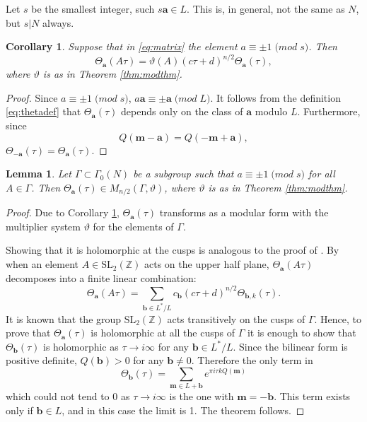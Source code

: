 \documentclass[11pt,a4paper]{amsart}
\newtheorem{lemma}[theorem]{Lemma}
\newtheorem{corollary}[theorem]{Corollary}
\theoremstyle{definition}
\newcommand{\SZ}{\mathbb{Z}}                    %
\begin{document}
Let $s$ be the smallest integer, such $s\mathbf{a} \in L$. This is, in general, not the same as $N$, but $s|N$ always. 
\begin{corollary}
	\label{cor:mult} 
	Suppose that in \eqref{eq:matrix} the element $a \equiv \pm 1 \; \mathrm(mod\; s)$.
	Then 
	\[ \Theta_{\mathbf{a}}(A\tau)= \vartheta(A)(c\tau+d)^{n/2} \Theta_{\mathbf{a}}(\tau), \]
	where $\vartheta$ is as in Theorem \ref{thm:modthm}.
\end{corollary}
\begin{proof}
	Since $a \equiv \pm 1 \; \mathrm(mod\; s)$, $a \mathbf{a} \equiv \pm\mathbf{a} \; \mathrm(mod\; L)$. It follows from the definition \eqref{eq:thetadef} that $\Theta_{\mathbf{a}}(\tau)$ depends only on the class of $\mathbf{a}$ modulo $L$. Furthermore, since
	\[ Q(\mathbf{m}-\mathbf{a})=Q(-\mathbf{m}+\mathbf{a}), \]
	$\Theta_{-\mathbf{a}}(\tau)= \Theta_{\mathbf{a}}(\tau)$.
\end{proof}
\begin{lemma} 
	\label{lem:mult2}
	Let $\Gamma \subset \Gamma_0(N)$ be a subgroup such that $a \equiv \pm 1 \; \mathrm(mod\; s)$ for all $A \in \Gamma$. Then $\Theta_{\mathbf{a}}(\tau) \in M_{n/2}(\Gamma, \vartheta)$, where $\vartheta$ is as in Theorem \ref{thm:modthm}.
\end{lemma}
\begin{proof} Due to Corollary \ref{cor:mult}, $\Theta_{\mathbf{a}}(\tau)$ transforms as a modular form with the multiplier system $\vartheta$ for the elements of $\Gamma$. 
	
	Showing that it is holomorphic at the cusps is analogous to the proof of \cite[Corollary 14.3.16]{cohen2017modular}. By \cite[Theorem 14.3.7]{cohen2017modular} when an element $A \in \textrm{SL}_2(\SZ)$ acts on the upper half plane, $\Theta_{\mathbf{a}}(A\tau)$ decomposes into a finite linear combination:
	\[ \Theta_{\mathbf{a}}(A\tau)=\sum_{\mathbf{b} \in L^{\ast}/L}c_{\mathbf{b}}(c\tau+d)^{n/2}\Theta_{\mathbf{b},k}(\tau). \]
	It is known that the group $\textrm{SL}_2(\SZ)$ acts transitively on the cusps of $\Gamma$.  Hence, to prove that $\Theta_{\mathbf{a}}(\tau)$ is holomorphic at all the cusps of $\Gamma$ it is enough to show that $\Theta_{\mathbf{b}}(\tau)$ is holomorphic as $\tau \to i\infty$ for any $\mathbf{b} \in L^{\ast}/L$. Since the bilinear form is positive definite, $Q(\mathbf{b})>0$ for any $\mathbf{b} \neq 0$. Therefore the only term in
	\[\Theta_{\mathbf{b}}(\tau)= \sum_{\mathbf{m} \in L+\mathbf{b}} e^{\pi i \tau k Q(\mathbf{m})}\]
	which could not tend to 0  as $\tau \to i\infty$ is the one with $\mathbf{m}=-\mathbf{b}$. This term exists only if $\mathbf{b} \in L$, and in this case the limit is 1. The theorem follows.
\end{proof}
\end{document}
